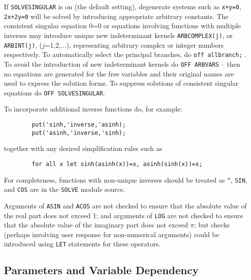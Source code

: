 If {\tt SOLVESINGULAR} is on (the default setting),
degenerate systems such as {\tt x+y=0}, {\tt 2x+2y=0} will be solved by
introducing appropriate arbitrary constants.
The consistent singular equation 0=0 or equations involving functions with
multiple inverses may introduce unique new indeterminant kernels
{\tt ARBCOMPLEX(j)}, or {\tt ARBINT(j)}, ($j$=1,2,...),  %
representing arbitrary complex or integer numbers respectively.  To
automatically select the principal branches, do {\tt off allbranch;} .
 To avoid the introduction of new indeterminant kernels
do {\tt OFF ARBVARS} -- then no equations are generated for the free
variables and their original names are used to express the solution forms.
To suppress solutions of consistent singular equations do
{\tt OFF SOLVESINGULAR}.

To incorporate additional inverse functions do, for example:
\begin{verbatim}
        put('sinh,'inverse,'asinh);
        put('asinh,'inverse,'sinh);
\end{verbatim}
together with any desired simplification rules such as
\begin{verbatim}
        for all x let sinh(asinh(x))=x, asinh(sinh(x))=x;
\end{verbatim}
For completeness, functions with non-unique inverses should be treated as
{\tt \verb|^|}, {\tt SIN}, and {\tt COS} are in the {\tt SOLVE}
 module source.

Arguments of {\tt ASIN} and {\tt ACOS} are not checked to ensure that the
absolute value of the real part does not exceed 1; and arguments of
{\tt LOG} are not checked to  ensure that the absolute value of the imaginary
part does not exceed $\pi$; but checks (perhaps involving user response
for non-numerical arguments) could be introduced using
{\tt LET} statements for these operators.

\subsection{Parameters and Variable Dependency}

